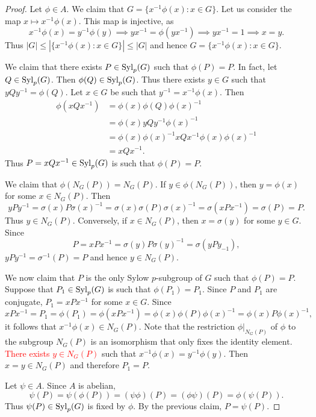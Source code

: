 \begin{proof}
    Let $\phi\in A$. We claim that 
    $G=\{x^{-1}\phi(x):x\in G\}$. Let us consider the map 
    $x\mapsto x^{-1}\phi(x)$. This map is injective, as 
    \[
    x^{-1}\phi(x)=y^{-1}\phi(y)\implies 
    yx^{-1}=\phi(yx^{-1})\implies yx^{-1}=1\implies x=y.
    \]
    Thus $|G|\leq |\{x^{-1}\phi(x):x\in G\}|\leq |G|$ and hence
    $G=\{x^{-1}\phi(x):x\in G\}$. 

    We claim that there exists $P\in\mathrm{Syl}_p(G)$ such that $\phi(P)=P$. In fact, 
    let $Q\in\mathrm{Syl}_p(G)$. Then $\phi(Q)\in\mathrm{Syl}_p(G)$. Thus 
    there exists $y\in G$ such that $yQy^{-1}=\phi(Q)$. Let $x\in G$ 
    be such that $y^{-1}=x^{-1}\phi(x)$. Then
    \begin{align*}
    \phi(xQx^{-1})&=\phi(x)\phi(Q)\phi(x)^{-1}\\
    &=\phi(x)yQy^{-1}\phi(x)^{-1}\\
    &=\phi(x)\phi(x)^{-1}xQx^{-1}\phi(x)\phi(x)^{-1}\\
    &=xQx^{-1}.      
    \end{align*}
    Thus $P=xQx^{-1}\in\mathrm{Syl}_p(G)$ is such that $\phi(P)=P$. 

    We claim that $\phi(N_G(P))=N_G(P)$. If $y\in \phi(N_G(P))$, then 
    $y=\phi(x)$ for some $x\in N_G(P)$. Then 
    \[
    yPy^{-1}=\sigma(x)P\sigma(x)^{-1}=\sigma(x)\sigma(P)\sigma(x)^{-1}=\sigma(xPx^{-1})=\sigma(P)=P.
    \]
    Thus $y\in N_G(P)$. Conversely, if $x\in N_G(P)$, then $x=\sigma(y)$ for some $y\in G$. Since 
    \[
    P=xPx^{-1}=\sigma(y)P\sigma(y)^{-1}=\sigma(yPy_{-1}),
    \]
    $yPy^{-1}=\sigma^{-1}(P)=P$ and hence $y\in N_G(P)$. 
    
    We now claim that $P$ is the only Sylow $p$-subgroup of $G$ such that $\phi(P)=P$. Suppose that 
    $P_1\in\mathrm{Syl}_p(G)$ is such that $\phi(P_1)=P_1$. 
    Since $P$ and $P_1$ are conjugate, 
    $P_1=xPx^{-1}$ for some $x\in G$. Since
    \[
    xPx^{-1}=P_1=\phi(P_1)=\phi(xPx^{-1})=\phi(x)\phi(P)\phi(x)^{-1}
    =\phi(x)P\phi(x)^{-1},
    \]
    it follows that 
    $x^{-1}\phi(x)\in N_G(P)$. Note that 
    the restriction $\phi|_{N_G(P)}$ of $\phi$ to 
    the subgroup $N_G(P)$ is an isomorphism that 
    only fixes the identity element. 
    \textcolor{red}{There exists $y\in N_G(P)$} such that $x^{-1}\phi(x)=y^{-1}\phi(y)$. Then $x=y\in N_G(P)$ and therefore
    $P_1=P$. 

    Let $\psi\in A$. Since $A$ is abelian, 
    \[
    \psi(P)=\psi(\phi(P))=(\psi\phi)(P)=(\phi\psi)(P)=\phi(\psi(P)).
    \]
    Thus $\psi(P)\in\mathrm{Syl}_p(G)$ is fixed by $\phi$. By the previous
    claim, $P=\psi(P)$. 
\end{proof}

